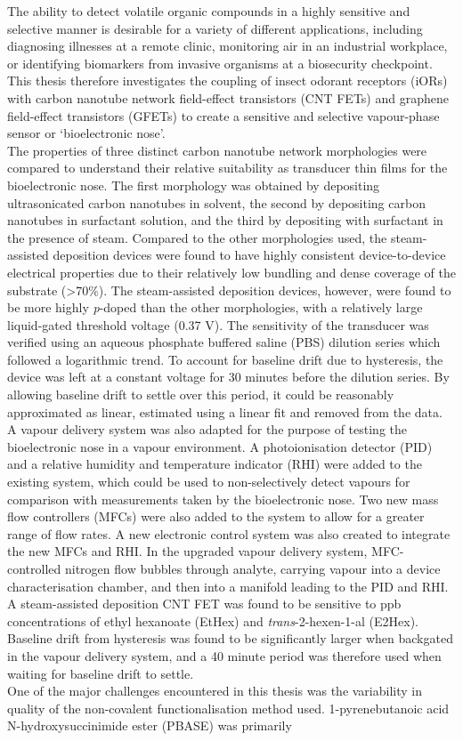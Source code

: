 \documentclass[
  a4paper,
]{scrbook}
\begin{document}
The ability to detect volatile organic compounds in a highly sensitive and selective manner is desirable for a variety of different applications, including diagnosing illnesses at a remote clinic, monitoring air in an industrial workplace, or identifying biomarkers from invasive organisms at a biosecurity checkpoint. This thesis therefore investigates the coupling of insect odorant receptors (iORs) with carbon nanotube network field-effect transistors (CNT FETs) and graphene field-effect transistors (GFETs) to create a sensitive and selective vapour-phase sensor or ‘bioelectronic nose’. \\[5pt] The properties of three distinct carbon nanotube network morphologies were compared to understand their relative suitability as transducer thin films for the bioelectronic nose. The first morphology was obtained by depositing ultrasonicated carbon nanotubes in solvent, the second by depositing carbon nanotubes in surfactant solution, and the third by depositing with surfactant in the presence of steam. Compared to the other morphologies used, the steam-assisted deposition devices were found to have highly consistent device-to-device electrical properties due to their relatively low bundling and dense coverage of the substrate (>70\%). The steam-assisted deposition devices, however, were found to be more highly \textit{p}-doped than the other morphologies, with a relatively large liquid-gated threshold voltage (0.37 V). The sensitivity of the transducer was verified using an aqueous phosphate buffered saline (PBS) dilution series which followed a logarithmic trend. To account for baseline drift due to hysteresis, the device was left at a constant voltage for 30 minutes before the dilution series. By allowing baseline drift to settle over this period, it could be reasonably approximated as linear, estimated using a linear fit and removed from the data. \\[5pt] A vapour delivery system was also adapted for the purpose of testing the bioelectronic nose in a vapour environment. A photoionisation detector (PID) and a relative humidity and temperature indicator (RHI) were added to the existing system, which could be used to non-selectively detect vapours for comparison with measurements taken by the bioelectronic nose. Two new mass flow controllers (MFCs) were also added to the system to allow for a greater range of flow rates. A new electronic control system was also created to integrate the new MFCs and RHI. In the upgraded vapour delivery system, MFC-controlled nitrogen flow bubbles through analyte, carrying vapour into a device characterisation chamber, and then into a manifold leading to the PID and RHI. A steam-assisted deposition CNT FET was found to be sensitive to ppb concentrations of ethyl hexanoate (EtHex) and \textit{trans}-2-hexen-1-al (E2Hex). Baseline drift from hysteresis was found to be significantly larger when backgated in the vapour delivery system, and a 40 minute period was therefore used when waiting for baseline drift to settle. \\[5pt] One of the major challenges encountered in this thesis was the variability in quality of the non-covalent functionalisation method used. 1-pyrenebutanoic acid N-hydroxysuccinimide ester (PBASE) was primarily 
\end{document}
